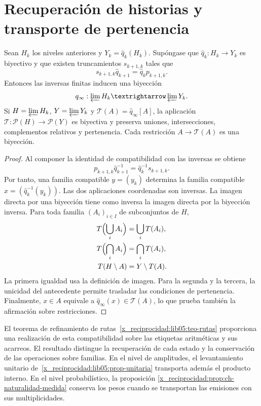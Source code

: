 \section{Recuperación de historias y transporte de pertenencia}
\begin{proposition}
\label{x_reciprocidad:lib07:prop-familias}
Sean \(H_k\) los niveles anteriores y \(Y_k=\widehat q_k(H_k)\).
Supóngase que \(\widehat q_k:H_k\to Y_k\) es biyectivo y que existen
truncamientos \(s_{k+1,k}\) tales que
\[
 s_{k+1,k}\widehat q_{k+1}=\widehat q_k p_{k+1,k}.
\]
Entonces las inversas finitas inducen una biyección
\[
 \widehat q_\infty:\varprojlim H_k\longrightarrow\varprojlim Y_k.
\]
Si \(H=\varprojlim H_k\), \(Y=\varprojlim Y_k\) y
\(\mathcal T(A)=\widehat q_\infty[A]\), la aplicación
\(\mathcal T:\mathcal P(H)\to\mathcal P(Y)\) es biyectiva y
preserva uniones, intersecciones, complementos relativos y pertenencia.
Cada restricción \(A\to\mathcal T(A)\) es una biyección.
\end{proposition}
\begin{proof}
Al componer la identidad de compatibilidad con las inversas se obtiene
\[
 p_{k+1,k}\widehat q_{k+1}^{-1}
   =\widehat q_k^{-1}s_{k+1,k}.
\]
Por tanto, una familia compatible \(y=(y_k)\) determina la familia
compatible \(x=(\widehat q_k^{-1}(y_k))\). Las dos aplicaciones
coordenadas son inversas. La imagen directa por una biyección tiene
como inversa la imagen directa por la biyección inversa. Para toda
familia \((A_i)_{i\in I}\) de subconjuntos de \(H\),
\[
 \begin{aligned}
 \mathcal T\Bigl(\bigcup_i A_i\Bigr)&=\bigcup_i\mathcal T(A_i),\\
 \mathcal T\Bigl(\bigcap_i A_i\Bigr)&=\bigcap_i\mathcal T(A_i),\\
 \mathcal T(H\setminus A)&=Y\setminus\mathcal T(A).
 \end{aligned}
\]
La primera igualdad usa la definición de imagen. Para la segunda y
la tercera, la unicidad del antecedente permite trasladar las
condiciones de pertenencia. Finalmente,
\(x\in A\) equivale a
\(\widehat q_\infty(x)\in\mathcal T(A)\), lo que prueba también
la afirmación sobre restricciones.
\end{proof}

El teorema de refinamiento de rutas~\ref{x_reciprocidad:lib05:teo-rutas}
proporciona una realización de esta compatibilidad sobre las etiquetas
aritméticas y sus acarreos. El resultado distingue la recuperación
de cada estado y la conservación de las operaciones sobre familias.
En el nivel de amplitudes, el levantamiento unitario
de~\ref{x_reciprocidad:lib05:prop-unitaria} transporta además el producto interno.
En el nivel probabilístico, la proposición
\ref{x_reciprocidad:prop:ch-naturalidad-medida} conserva los pesos cuando se
transportan las emisiones con sus multiplicidades.


